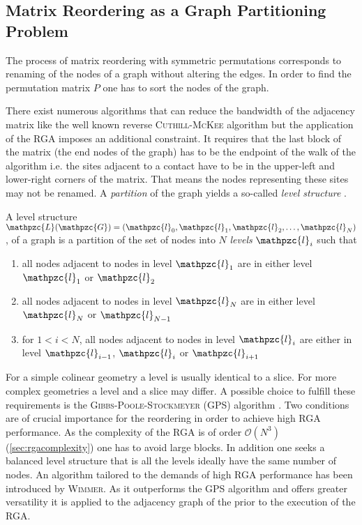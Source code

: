 \subsection{Matrix Reordering as a Graph Partitioning Problem}
The process of matrix reordering with symmetric permutations corresponds to renaming of the nodes of a graph without altering the edges. In order to find the permutation matrix $P$ one has to sort the nodes of the graph.\par
There exist numerous algorithms that can reduce the bandwidth of the adjacency matrix like the well known reverse \textsc{Cuthill-McKee} algorithm but the application of the RGA imposes an additional constraint. It requires that the last block of the matrix (the end nodes of the graph) has to be the endpoint of the walk of the algorithm i.e. the sites adjacent to a contact have to be in the upper-left and lower-right corners of the matrix. That means the nodes representing these sites may not be renamed. A \emph{partition} of the graph yields a so-called \emph{level structure} \cite{gibbs.Siam.13.236}.
\begin{dfn}
A level structure $\mathpzc{L}(\mathpzc{G}) = (\mathpzc{l}_0,\mathpzc{l}_1,\mathpzc{l}_2,\dotsc,\mathpzc{l}_N)$, of a graph  is a partition of the set of nodes  into $N$ \emph{levels} $\mathpzc{l}_i$ such that
\begin{enumerate}
\item all nodes adjacent to nodes in level $\mathpzc{l}_1$ are in either level $\mathpzc{l}_1$ or $\mathpzc{l}_2$
\item all nodes adjacent to nodes in level $\mathpzc{l}_N$ are in either level $\mathpzc{l}_{N}$ or $\mathpzc{l}_{N-1}$
\item for $1 < i < N$, all nodes adjacent to nodes in level $\mathpzc{l}_{i}$ are either in level $\mathpzc{l}_{i-1}$, $\mathpzc{l}_{i}$ or $\mathpzc{l}_{i+1}$
\end{enumerate}
\end{dfn}
For a simple colinear geometry a level is usually identical to a slice. For more complex geometries a level and a slice may differ. A possible choice to fulfill these requirements is the \textsc{Gibbs-Poole-Stockmeyer} (GPS) algorithm \cite{gibbs.Siam.13.236}. Two conditions are of crucial importance for the reordering in order to achieve high RGA performance. As the complexity of the RGA is of order $\mathcal{O}(N^3)$(\cref{sec:rgacomplexity}) one has to avoid large blocks. In addition one seeks a balanced level structure that is all the levels ideally have the same number of nodes.
An algorithm tailored to the demands of high RGA performance has been introduced by \textsc{Wimmer}. As it outperforms the GPS algorithm and offers greater versatility \cite{Wimmer2009JComPhys} it is applied to the adjacency graph of the \hamil{} prior to the execution of the RGA.
